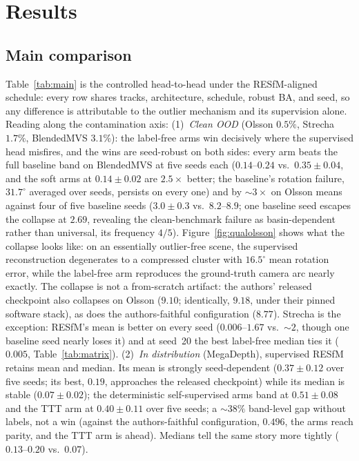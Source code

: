 \documentclass{article}
\renewcommand{\deg}{^{\circ}}
\begin{document}
\section{Results}
\subsection{Main comparison}
Table~\ref{tab:main} is the controlled head-to-head under the RESfM-aligned schedule:
every row shares tracks, architecture, schedule, robust BA, and seed, so any difference is
attributable to the outlier mechanism and its supervision alone. Reading along the
contamination axis:
(1)~\emph{Clean OOD} (Olsson $0.5\%$, Strecha $1.7\%$, BlendedMVS $3.1\%$): the
label-free arms win decisively where the supervised head misfires, and the wins are
seed-robust on both sides: every arm beats the full baseline band on BlendedMVS
at five seeds each ($0.14$--$0.24$ vs.\ $0.35\pm0.04$, and the soft arms at
$0.14\pm0.02$ are $2.5\times$ better; the baseline's rotation failure, $31.7\deg$
averaged over seeds, persists on every one) and by ${\sim}3\times$ on Olsson means against four of five baseline
seeds ($3.0\pm0.3$ vs.\ $8.2$--$8.9$; one baseline seed escapes the collapse at $2.69$,
revealing the clean-benchmark failure as basin-dependent rather than universal, its
frequency $4/5$). Figure~\ref{fig:qualolsson} shows what the collapse looks like:
on an essentially outlier-free scene, the supervised reconstruction degenerates to a
compressed cluster with $16.5\deg$ mean rotation error, while the label-free arm
reproduces the ground-truth camera arc nearly exactly. The collapse is not a from-scratch artifact: the authors' released
checkpoint also collapses on Olsson ($9.10$; identically, $9.18$, under their pinned
software stack), as does the authors-faithful configuration ($8.77$). Strecha is the exception: RESfM's mean is better on every seed
($0.006$--$1.67$ vs.\ $\sim\!2$, though one baseline seed nearly loses it) and at
seed~20 the best label-free median ties it ($0.005$, Table~\ref{tab:matrix}).
(2)~\emph{In distribution} (MegaDepth), supervised RESfM retains mean and median.
Its mean is strongly seed-dependent ($0.37\pm0.12$ over five seeds; its best, $0.19$,
approaches the released checkpoint) while its median is stable ($0.07\pm0.02$); the
deterministic self-supervised arms band at $0.51\pm0.08$ and the TTT arm at
$0.40\pm0.11$ over five seeds; a $\sim\!38\%$ band-level gap without labels, not a win
(against the authors-faithful configuration, $0.496$, the arms reach parity, and the TTT
arm is ahead). Medians tell the same story more tightly ($0.13$--$0.20$ vs.\ $0.07$).
\end{document}
